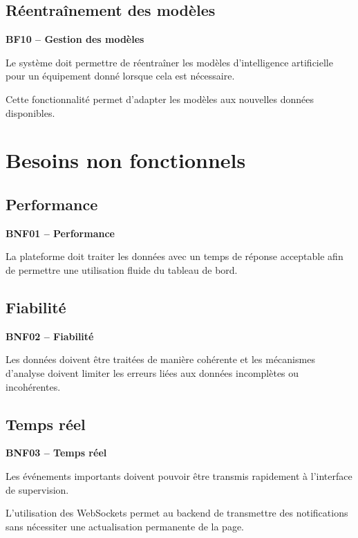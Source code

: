 \subsection{Réentraînement des modèles}

\textbf{BF10 -- Gestion des modèles}

Le système doit permettre de réentraîner les modèles d'intelligence
artificielle pour un équipement donné lorsque cela est nécessaire.

Cette fonctionnalité permet d'adapter les modèles aux nouvelles données
disponibles.


\section{Besoins non fonctionnels}

\subsection{Performance}

\textbf{BNF01 -- Performance}

La plateforme doit traiter les données avec un temps de réponse acceptable
afin de permettre une utilisation fluide du tableau de bord.

\subsection{Fiabilité}

\textbf{BNF02 -- Fiabilité}

Les données doivent être traitées de manière cohérente et les mécanismes
d'analyse doivent limiter les erreurs liées aux données incomplètes ou
incohérentes.

\subsection{Temps réel}

\textbf{BNF03 -- Temps réel}

Les événements importants doivent pouvoir être transmis rapidement à
l'interface de supervision.

L'utilisation des WebSockets permet au backend de transmettre des
notifications sans nécessiter une actualisation permanente de la page.

